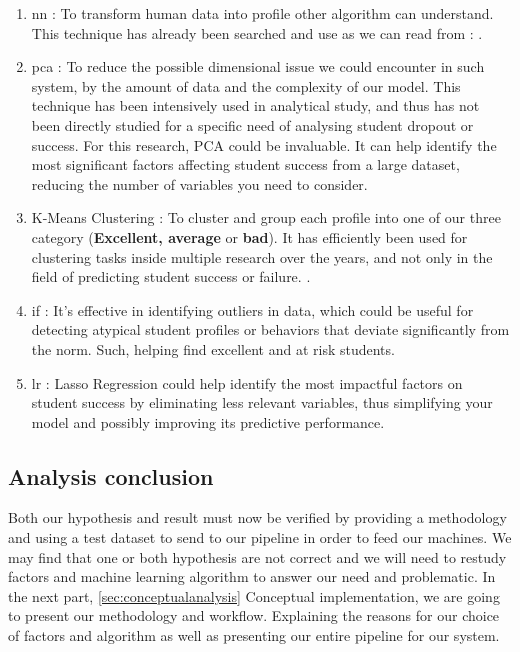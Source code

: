\documentclass[../main.tex]{subfiles}
\begin{document}
\begin{enumerate}
    \item \acrfull{nn} : To transform human data into profile other algorithm can understand. This technique has already been searched and use as we can read from : \cite{m_alban_she_is_with_the_faculty_of_engineering_and_applied_sciences_of_the_technical_university_cotopaxi_neural_2019, siri_predicting_2015, viloria_integration_2019, zhang_neural_2000}.
    \item \acrfull{pca} : To reduce the possible dimensional issue we could encounter in such system, by the amount of data and the complexity of our model. This technique has been intensively used in analytical study, and thus has not been directly studied for a specific need of analysing student dropout or success. For this research, PCA could be invaluable. It can help identify the most significant factors affecting student success from a large dataset, reducing the number of variables you need to consider.
    \item K-Means Clustering : To cluster and group each profile into one of our three category (\textbf{Excellent, average} or \textbf{bad}). It has efficiently been used for clustering tasks inside multiple research over the years, and not only in the field of predicting student success or failure. \cite{de_o_santos_supervised_2019, mardolkar_forecasting_2020,shiful_machine_2021}.
    \item \acrfull{if} : It's effective in identifying outliers in data, which could be useful for detecting atypical student profiles or behaviors that deviate significantly from the norm. Such, helping find excellent and at risk students.
    \item \acrfull{lr} : Lasso Regression could help identify the most impactful factors on student success by eliminating less relevant variables, thus simplifying your model and possibly improving its predictive performance. 
\end{enumerate}


\subsection{Analysis conclusion}
\label{subsec:analysis_conclusion}
Both our hypothesis and result must now be verified by providing a methodology and using a test dataset to send to our pipeline in order to feed our machines.
We may find that one or both hypothesis are not correct and we will need to restudy factors and machine learning algorithm to answer our need and problematic. 
In the next part, \ref{sec:conceptualanalysis} Conceptual implementation, we are going to present our methodology and workflow. Explaining the reasons for our choice of factors and algorithm as well as presenting our entire pipeline for our system.
\end{document}

